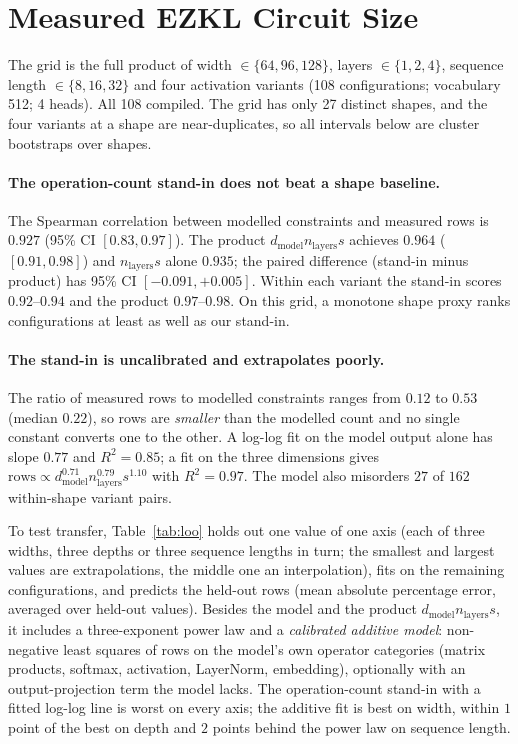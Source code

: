 \documentclass[10pt]{article}
\newcommand{\dmodel}{d_{\mathrm{model}}}
\newcommand{\nlayers}{n_{\mathrm{layers}}}
\begin{document}
\section{Measured EZKL Circuit Size}
\label{sec:ezkl}

The grid is the full product of width $\in\{64,96,128\}$, layers
$\in\{1,2,4\}$, sequence length $\in\{8,16,32\}$ and four activation variants
(108 configurations; vocabulary 512; 4 heads). All 108 compiled. The grid has
only 27 distinct shapes, and the four variants at a shape are near-duplicates, so
all intervals below are cluster bootstraps over shapes.

\paragraph{The operation-count stand-in does not beat a shape baseline.}
The Spearman correlation between modelled constraints and measured rows is
$0.927$ (95\% CI $[0.83,0.97]$). The product $\dmodel\nlayers s$ achieves $0.964$
($[0.91,0.98]$) and $\nlayers s$ alone $0.935$; the paired difference
(stand-in minus product) has 95\% CI $[-0.091,+0.005]$. Within each variant the
stand-in scores $0.92$--$0.94$ and the product $0.97$--$0.98$. On this grid,
a monotone shape proxy ranks configurations at least as well as our stand-in.

\paragraph{The stand-in is uncalibrated and extrapolates poorly.}
The ratio of measured rows to modelled constraints ranges from $0.12$ to $0.53$
(median $0.22$), so rows are \emph{smaller} than the modelled count and no single
constant converts one to the other. A log-log fit on the model output alone has
slope $0.77$ and $R^2{=}0.85$; a fit on the three dimensions gives
$\mathrm{rows}\propto \dmodel^{0.71}\nlayers^{0.79}s^{1.10}$ with $R^2{=}0.97$.
The model also misorders $27$ of $162$ within-shape variant pairs.

To test transfer, Table~\ref{tab:loo} holds out one value of one axis (each of
three widths, three depths or three sequence lengths in turn; the smallest and
largest values are extrapolations, the middle one an interpolation), fits on the
remaining configurations, and predicts the held-out rows (mean absolute
percentage error, averaged over held-out values). Besides the model and the
product $\dmodel\nlayers s$, it includes a three-exponent power law and a
\emph{calibrated additive model}: non-negative least squares of rows on the
model's own operator categories (matrix products, softmax, activation,
LayerNorm, embedding), optionally with an output-projection term the model
lacks. The operation-count stand-in with a fitted log-log line is worst on every axis; the
additive fit is best on width, within $1$ point of the best on depth and $2$
points behind the power law on sequence length.
\end{document}
